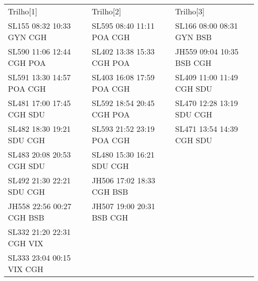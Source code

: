\documentclass{endm}
\begin{document}
\begin{center}

\renewcommand{\arraystretch}{0.6}

\label {tabela3}
\begin{longtable}{lll} 

\\

\scriptsize Trilho[1] &	 \scriptsize Trilho[2] & \scriptsize Trilho[3]\\
\scriptsize SL155 08:32 10:33 GYN CGH  & \scriptsize SL595 08:40 11:11 POA CGH & 		\scriptsize SL166 08:00 08:31 GYN BSB\\
\scriptsize SL590 11:06 12:44 CGH POA	 & \scriptsize SL402 13:38 15:33 CGH POA &		\scriptsize JH559 09:04 10:35 BSB CGH\\
\scriptsize SL591 13:30 14:57 POA CGH & 	\scriptsize SL403 16:08 17:59 POA CGH & 	\scriptsize SL409 11:00 11:49 CGH SDU\\
\scriptsize SL481 17:00 17:45 CGH SDU & 	\scriptsize SL592 18:54 20:45 CGH POA & 	\scriptsize SL470 12:28 13:19 SDU CGH\\
\scriptsize SL482 18:30 19:21 SDU CGH & 	\scriptsize SL593 21:52 23:19 POA CGH & 	\scriptsize SL471 13:54 14:39 CGH SDU\\
\scriptsize SL483 20:08 20:53 CGH SDU & 	\scriptsize SL480 15:30 16:21 SDU CGH  & \\
\scriptsize SL492 21:30 22:21 SDU CGH & 	\scriptsize JH506 17:02 18:33 CGH BSB  & \\
\scriptsize JH558 22:56 00:27 CGH BSB &       \scriptsize JH507 19:00 20:31 BSB CGH  & \\
\scriptsize SL332 21:20 22:31 CGH VIX  &  & \\
\scriptsize SL333 23:04 00:15 VIX CGH   &    & \\ 
	

\end{longtable}
\end{center}
\end{document}
